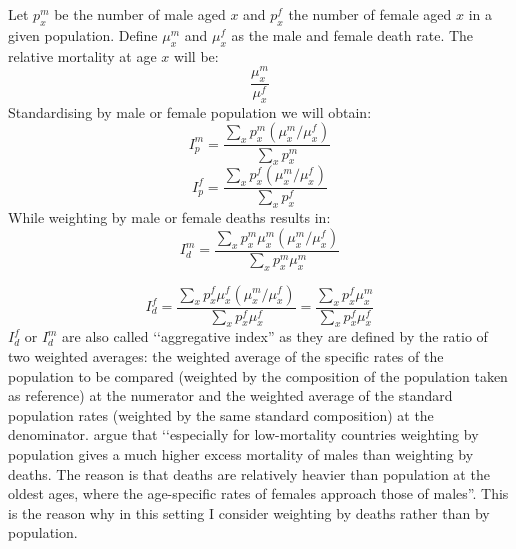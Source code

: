 \documentclass[\main/main.tex]{subfiles}
\begin{document}
Let $p^m_x$ be the number of male aged $x$ and $p^f_x$ the number of female aged $x$ in a given population. Define $\mu^m_x$ and $\mu^f_x$ as the male and female death rate. The relative mortality at age $x$ will be:
\begin{equation}
    \frac{\mu^m_x}{\mu^f_x}
\end{equation}
Standardising by male or female population we will obtain:
\begin{equation}
    I^m_p = \frac{\sum_{x}p^m_x (\mu^m_x / \mu^f_x)}{\sum_{x} p^m_x}
\end{equation}
\begin{equation}
    I^f_p = \frac{\sum_{x}p^f_x (\mu^m_x / \mu^f_x)}{\sum_{x} p^f_x}
\end{equation}
While weighting by male or female deaths results in:
\begin{equation}
    I^m_d = \frac{\sum_{x}p^m_x \mu^m_x (\mu^m_x / \mu^f_x)}{\sum_{x} p^m_x \mu^m_x}
\end{equation}

\begin{equation}
    I^f_d = \frac{\sum_{x}p^f_x \mu^f_x (\mu^m_x / \mu^f_x)}{\sum_{x} p^f_x \mu^f_x} = \frac{\sum_{x}p^f_x \mu^m_x}{\sum_{x} p^f_x \mu^f_x}
\end{equation}
$I^f_d$ or  $I^m_d$ are also called \lq\lq aggregative index'' as they are defined by the ratio of two weighted averages: the weighted average of the specific rates of the population to be compared (weighted by the composition of the population taken as reference) at the numerator and the weighted average of the standard population rates (weighted by the same standard composition) at the denominator.
\cite{Keyfitz2005} argue that \lq\lq especially for low-mortality countries weighting by population gives a much higher excess mortality of males than weighting by deaths. The reason is that deaths are relatively heavier than population at the oldest ages, where the age-specific rates of females approach those of males''. This is the reason why in this setting I consider weighting by deaths rather than by population.









\end{document}
